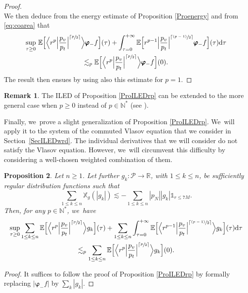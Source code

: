 \documentclass[JEP,XML,SOM,Unicode,published]{cedram}
\newcommand{\psfrac}[2]{\sfrac{(#1)}{#2}}
\theoremstyle{plain}
\newtheorem{proposition}{Proposition}[section]
\theoremstyle{definition}
\newtheorem{remark}[proposition]{Remark}
\newcommand\R{{\mathbb{R}}}
\newcommand\T{{\mathbb{X}}}
\newcommand\dr{{\mathrm{d}}}
\begin{document}
\begin{proof}
\[\]
We then deduce from the energy estimate of Proposition \ref{Proenergy} and from \eqref{eq:coarea} that
\begin{multline*}
\sup_{\tau \geq 0}\, \mathbb{E}\Bigl[ \Big\langle r^{p} \Big|\frac{p_v}{p_t}\Big|^{\lceil \sfrac{p}{2} \rceil} \Big\rangle \pmb{\varphi}_- f \Bigr] (\tau)+\int_{\tau=0}^{+\infty} \mathbb{E}\Bigl[ r^{p-1} \Big|\frac{p_v}{p_t}\Big|^{\lceil \psfrac{p-1}{2} \rceil} \pmb{\varphi}_- f \Bigr] (\tau) \dr \tau \\
\lesssim_p \mathbb{E} \Bigl[ \Big\langle r^{p} \Big|\frac{p_v}{p_t}\Big|^{\lceil \sfrac{p}{2} \rceil} \Big\rangle \pmb{\varphi}_- f \Bigr] (0).
\end{multline*}
The result then ensues by using also this estimate for $p=1$.
\end{proof}

\begin{remark}\label{Rkrpgen}
The ILED of Proposition \ref{ProILEDrp} can be extended to the more general case when $p\geq 0$ instead of $p\in \mathbb{N}^*$ (see \cite[\S 4]{L23}). \end{remark}

Finally, we~prove a slight generalization of Proposition \ref{ProILEDrp}. We~will apply it to the system of the commuted Vlasov equation that we consider in Section~\ref{SecILEDwrd}. The individual derivatives that we will consider do not satisfy the Vlasov equation. However, we~will circumvent this difficulty by considering a well-chosen weighted combination of them.

\begin{proposition}\label{ProILEDrpbis}
Let $ n \geq 1$. Let further $g_k \colon \mathcal{P} \to \R$, with $1 \leq k \leq n$, be sufficiently regular distribution functions such that
\begin{equation}\label{eq:hypgk}
\sum_{1 \leq k \leq n} \T_g (|g_k|) \lesssim -\sum_{1 \leq k \leq n} |p_N| |g_k| \mathds{1}_{r \leq 7M}.
\end{equation}
Then, for any $p \in \mathbb{N}^*$, we~have
\begin{multline*}
\sup_{\tau \geq 0} \sum_{1 \leq k \leq n} \mathbb{E} \Bigl[ \Big\langle r^{p} \Big|\frac{p_v}{p_t}\Big|^{\lceil \sfrac{p}{2} \rceil} \Big\rangle g_k \Bigr] (\tau)+\sum_{1 \leq k \leq n} \int_{\tau=0}^{+\infty} \mathbb{E} \Bigl[ \Big\langle r^{p-1} \Big|\frac{p_v}{p_t}\Big|^{\lceil \psfrac{p-1}{2} \rceil} \Big\rangle g_k \Bigr] (\tau) \dr \tau \\
\lesssim_p \sum_{1 \leq k \leq n} \mathbb{E} \Bigl[ \Big\langle r^{p} \Big|\frac{p_v}{p_t}\Big|^{\lceil \sfrac{p}{2} \rceil} \Big\rangle g_k \Bigr] (0).
\end{multline*}
\end{proposition}
\begin{proof}
It suffices to follow the proof of Proposition \ref{ProILEDrp} by formally replacing $|\pmb{\varphi}_- f|$ by $\sum_k |g_k|$.
\end{proof}
\end{document}
